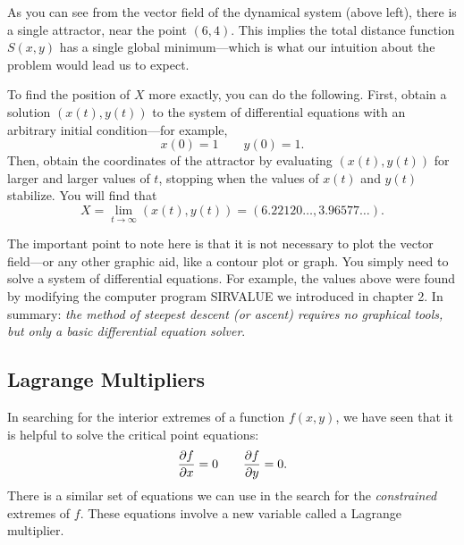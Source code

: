 {{{{

\mbox{}

\vspace{150pt}

        As you can see from the vector field of the dynamical system 
(above left), there is a single attractor, near the point $(6, 4)$.  This implies the total distance function $S(x, y)$ has a single global minimum---which is what our intuition about the problem would lead us to expect.  
        
        To find the position of $X$ more exactly, you can do the following. First, obtain a solution $(x(t), y(t))$ to the system of differential equations with an arbitrary initial condition---for example,
        \[
x(0)  = 1 \qquad y(0) = 1.
\]
Then, obtain the coordinates of the 
attractor by evaluating $(x(t), y(t))$ for larger and larger values of $t$, stopping when the values of $x(t)$ and $y(t)$ stabilize.  You will find that
        \[
X = \lim_{t \to \infty}(x(t), y(t)) = (6.22120\ldots, 3.96577\ldots).
\]  

        The important point to note here is that it is not necessary to plot the vector field---or any other graphic aid, like a contour plot or graph.  
You simply need to solve a system of differential equations.  For example, the values above were found by modifying the computer program SIRVALUE we introduced in chapter 2.   In summary: {\em the method of steepest descent (or ascent) requires no graphical tools, but only a basic differential equation solver}.\label{distribend}

\subsection{Lagrange Multipliers}

        In searching for the interior extremes of a function $f(x, y)$, we have seen that it is helpful to solve the critical point equations:
        \[
{\partial f \over \partial x} = 0\quad \quad
                {\partial f \over \partial y} = 0.
\]
There is a similar set of equations 
we can use in the search for the {\em constrained\/} extremes of $f$.  These equations involve a new variable called a Lagrange multiplier.

}}}}

